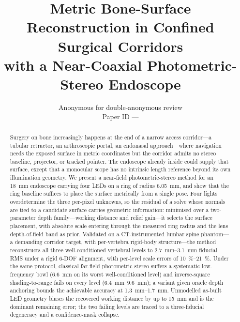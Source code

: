 \documentclass[conference]{IEEEtran}
\begin{document}
\title{\LARGE \bf Metric Bone-Surface Reconstruction in Confined Surgical Corridors\\
with a Near-Coaxial Photometric-Stereo Endoscope}

\author{Anonymous for double-anonymous review\\ Paper ID —}

\maketitle
\thispagestyle{empty}
\pagestyle{empty}

\begin{abstract}
Surgery on bone increasingly happens at the end of a narrow access
corridor---a tubular retractor, an arthroscopic portal, an endonasal
approach---where navigation needs the exposed surface in metric
coordinates but the corridor admits no stereo baseline, projector, or
tracked pointer.  The endoscope already inside could supply that surface,
except that a monocular scope has no intrinsic length reference beyond
its own illumination geometry.  We present a near-field
photometric-stereo method for an \SI{18}{\milli\meter} endoscope
carrying four LEDs on a ring of radius \SI{6.05}{\milli\meter}, and show that the
ring baseline suffices to place the surface metrically from a single
pose.  Four lights
overdetermine the three per-pixel unknowns, so the residual of a solve
whose normals are tied to a candidate surface carries geometric
information: minimised over a two-parameter depth family---working
distance and relief gain---it selects the surface placement, with absolute
scale entering through the measured ring radius and the lens
depth-of-field band as prior.  Validated on a CT-instrumented lumbar spine phantom---a demanding
corridor target, with per-vertebra rigid-body structure---the method
reconstructs all three well-conditioned vertebral levels to
\SIrange{2.7}{3.1}{\milli\meter} fiducial RMS under a rigid 6-DOF
alignment, with per-level scale errors of \SIrange{10}{21}{\percent}.
Under the same protocol, classical far-field photometric stereo suffers a
systematic low-frequency bowl (\SI{6.6}{\milli\meter} on its worst well-conditioned level)
and inverse-square shading-to-range fails on every level
(\SIrange{6.4}{9.6}{\milli\meter}); a variant given oracle depth anchoring
bounds the achievable accuracy at \SIrange{1.3}{1.7}{\milli\meter}.
Unmodelled as-built LED geometry biases the recovered working distance by
up to \SI{15}{\milli\meter} and is the dominant remaining error; the
two failing levels are traced to a three-fiducial degeneracy and a
confidence-mask collapse.
\end{abstract}
\end{document}
